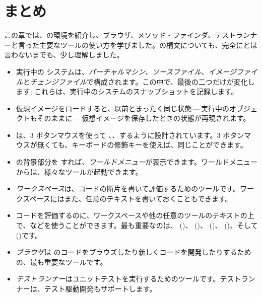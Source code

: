 \documentclass[a4paper,10pt,twoside]{book}
\begin{document}
\section{まとめ}
この章では、\pharo の環境を紹介し、ブラウザ、メソッド・ファインダ、テストランナーと言った主要なツールの使い方を学びました。\pharo の構文についても、完全にとは言わないまでも、少し理解しました。

\begin{itemize}
  \item 実行中の \pharo システムは、\emph{バーチャルマシン}、\emph{ソースファイル}、\emph{イメージファイル}と\emph{チェンジファイル}で構成されます。この中で、最後の二つだけが変化します; これらは、実行中のシステムのスナップショットを記録します。
  \item \pharo 仮想イメージをロードすると、以前とまったく同じ状態\,---\,実行中のオブジェクトもそのままに\,---\,仮想イメージを保存したときの状態が再現されます。
  \item \pharo は、3 ボタンマウスを使って \click、\actclick、\metaclick するように設計されています。3 ボタンマウスが無くても、キーボードの修飾キーを使えば、同じことができます。
  \item \pharo の背景部分を \click すれば、\emph{ワールドメニュー}が表示できます。ワールドメニューからは、様々なツールが起動できます。
  \item \emph{ワークスペース}は、コードの断片を書いて評価するためのツールです。ワークスペースにはまた、任意のテキストを書いておくこともできます。
  \item コードを評価するのに、ワークスペースや他の任意のツールのテキストの上で、などを使うことができます。最も重要なのは、 ()、 ()、 ()、 ()、そして  ()です。
  \item \emph{ブラウザ}は \pharo のコードをブラウズしたり新しくコードを開発したりするための、最も重要なツールです。
  \item \emph{テストランナー}はユニットテストを実行するためのツールです。テストランナーは、テスト駆動開発もサポートします。
\end{itemize}

\ifx\wholebook\relax\else 
   
   
\end{document}

